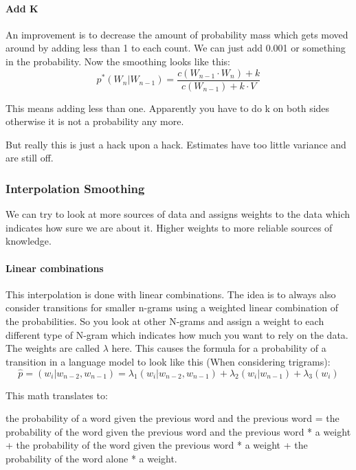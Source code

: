 \documentclass[
  11pt,
  british,
]{article}
\begin{document}
\hypertarget{add-k}{%
\paragraph{Add K}\label{add-k}}

An improvement is to decrease the amount of probability mass which gets
moved around by adding less than 1 to each count. We can just add 0.001
or something in the probability. Now the smoothing looks like this:
\[p^{*}(W_{n}|W_{n-1}) = \frac{c(W_{n-1}\cdot W_{n}) + k}{c(W_{n-1}) + k \cdot V}\]

This means adding less than one. Apparently you have to do k on both
sides otherwise it is not a probability any more.

But really this is just a hack upon a hack. Estimates have too little
variance and are still off.

\hypertarget{interpolation-smoothing}{%
\subsubsection{Interpolation Smoothing}\label{interpolation-smoothing}}

We can try to look at more sources of data and assigns weights to the
data which indicates how sure we are about it. Higher weights to more
reliable sources of knowledge.

\hypertarget{linear-combinations}{%
\paragraph{Linear combinations}\label{linear-combinations}}

This interpolation is done with linear combinations. The idea is to
always also consider transitions for smaller n-grams using a weighted
linear combination of the probabilities. So you look at other N-grams
and assign a weight to each different type of N-gram which indicates how
much you want to rely on the data. The weights are called \(\lambda\)
here. This causes the formula for a probability of a transition in a
language model to look like this (When considering trigrams):
\[\hat{p}=(w_i|w_{n-2}, w_{n-1}) = \lambda_1(w_i|w_{n-2}, w_{n-1}) + \lambda_2(w_{i}|w_{n-1}) + \lambda_3(w_i)\]

This math translates to:

the probability of a word given the previous word and the previous word
= the probability of the word given the previous word and the previous
word * a weight + the probability of the word given the previous word *
a weight + the probability of the word alone * a weight.
\end{document}
